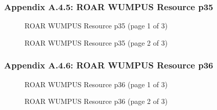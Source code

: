 \documentclass{article}[11pt]
\begin{document}
\subsubsection{Appendix A.4.5: ROAR WUMPUS Resource p35}
\begin{figure}[h]
\begin{center}
\end{center}
\caption{ROAR WUMPUS Resource p35 (page 1 of 3)}
\label{fig:roar-wumpus-resource-p35-page1}
\end{figure}
\newline
\begin{figure}[h]
\begin{center}
\end{center}
\caption{ROAR WUMPUS Resource p35 (page 2 of 3)}
\label{fig:roar-wumpus-resource-p35-page2}
\end{figure}
\newline
\newpage

\subsubsection{Appendix A.4.6: ROAR WUMPUS Resource p36}
\begin{figure}[h]
\begin{center}
\end{center}
\caption{ROAR WUMPUS Resource p36 (page 1 of 3)}
\label{fig:roar-wumpus-resource-p36-page1}
\end{figure}
\newline
\begin{figure}[h]
\begin{center}
\end{center}
\caption{ROAR WUMPUS Resource p36 (page 2 of 3)}
\label{fig:roar-wumpus-resource-p36-page2}
\end{figure}
\newline
\newpage
\end{document}
